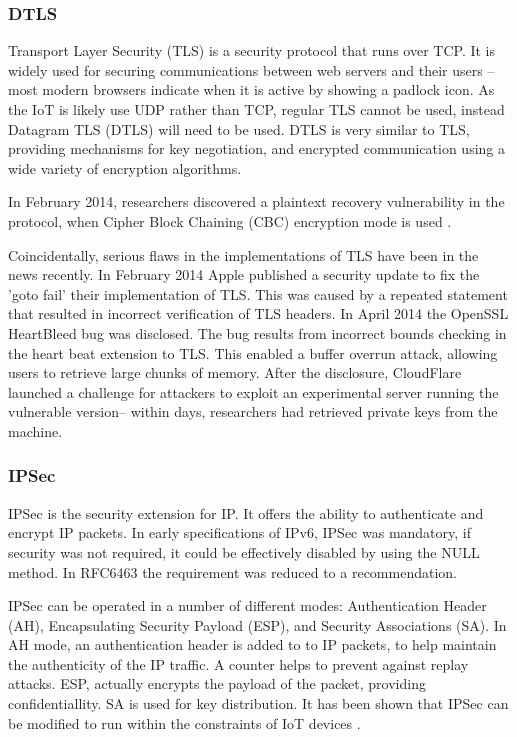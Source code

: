 \documentclass[10pt,journal,compsoc]{IEEEtran}
\begin{document}
\subsubsection{DTLS}
Transport Layer Security (TLS) is a security protocol that runs over TCP. It is
widely used for securing communications between web servers and their users --
most modern browsers indicate when it is active by showing a padlock icon. As
the IoT is likely use UDP rather than TCP, regular TLS cannot be used, instead
Datagram TLS (DTLS) will need to be used. DTLS is very similar to TLS,
providing mechanisms for key negotiation, and encrypted communication using a
wide variety of encryption algorithms.  

In February 2014, researchers discovered a plaintext recovery vulnerability in
the protocol, when Cipher Block Chaining (CBC) encryption mode is used
\cite{AlFardan2012}. 

Coincidentally, serious flaws in the implementations of TLS have been in the
news recently. In February 2014 Apple published a security update to fix the
'goto fail' their implementation of TLS.  This was caused by a repeated
statement that resulted in incorrect verification of TLS headers. In April 2014
the OpenSSL HeartBleed bug was disclosed. The bug results from incorrect bounds
checking in the heart beat extension to TLS. This enabled a buffer overrun
attack, allowing users to retrieve large chunks of memory. After the
disclosure, CloudFlare launched a challenge for attackers to exploit an
experimental server running the vulnerable version-- within days, researchers
had retrieved private keys from the machine.

\subsubsection{IPSec}
IPSec is the security extension for IP. It offers the ability to authenticate
and encrypt IP packets. In early specifications of IPv6, IPSec was mandatory,
if security was not required, it could be effectively disabled by using the
NULL method. In RFC6463 the requirement was reduced to a recommendation. 

IPSec can be operated in a number of different modes: Authentication Header
(AH), Encapsulating Security Payload (ESP), and Security Associations (SA).  In
AH mode, an authentication header is added to to IP packets, to help maintain
the authenticity of the IP traffic. A counter helps to prevent against replay
attacks. ESP, actually encrypts the payload of the packet, providing
confidentiallity. SA is used for key distribution. It has been shown that IPSec
can be modified to run within the constraints of IoT devices
\cite{Rubertis2013}.  
\end{document}
